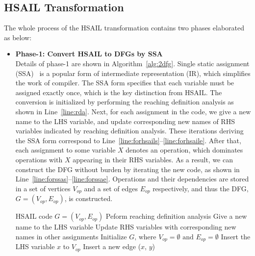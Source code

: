 \subsection{HSAIL Transformation}
\label{sec:trans}
The whole process of the HSAIL transformation contains two phases elaborated as below:
\begin{itemize}
    \item \textbf{Phase-1: Convert HSAIL to DFGs by SSA} \\\indent
        Details of phase-1 are shown in Algorithm~\ref{alg:2dfg}.
        Single static assignment (SSA)~\cite{ssa} is a popular form of intermediate representation (IR), which simplifies the work of compiler.
        The SSA form specifies that each variable must be assigned exactly once, which is the key distinction from HSAIL.
        The conversion is initialized by performing the reaching definition analysis \cite{rda} as shown in Line~\ref{line:rda}.
        Next, for each assignment in the code, we give a new name to the LHS variable, and update corresponding new names of RHS variables indicated by reaching definition analysis.
        These iterations deriving the SSA form correspond to Line~\ref{line:forhsails}--\ref{line:forhsaile}.
        After that, each assignment to some variable $X$ denotes an operation, which dominates operations with $X$ appearing in their RHS variables.
        As a result, we can construct the DFG without burden by iterating the new code, as shown in Line~\ref{line:forssas}--\ref{line:forssae}.
        Operations and their dependencies are stored in a set of vertices $V_{op}$ and a set of edges $E_{op}$ respectively, 
        and thus the DFG, $G = ( V_{op} , E_{op} )$, is constructed.
        \begin{algorithm}[ht!]    \caption{}
            \begin{algorithmic}[1]
                \Require    HSAIL code
                \Ensure     $G = ( V_{op} , E_{op} )$   
                \State      Peform reaching definition analysis     \label{line:rda}
                     \label{line:forhsails}
                \State      Give a new name to the LHS variable
                \State      Update RHS variables with corresponding new names in other assignments
                \EndFor                                                     \label{line:forhsaile}
                \State      Initialize $G \textrm{, where } V_{op} = \emptyset \textrm{ and } E_{op} = \emptyset $
                 \label{line:forssas}    
                \State      Insert the LHS variable $x$ to $V_{op}$
                \State      Insert a new edge ($x$, $y$)
                \EndFor
                \EndFor                                                         \label{line:forssae}
            \end{algorithmic}
            \label{alg:2dfg}
        \end{algorithm}


\end{itemize}

